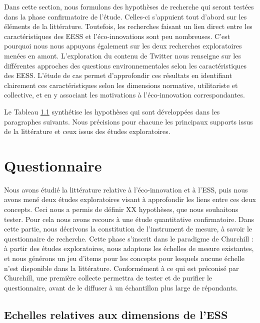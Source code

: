 Dans cette section, nous formulons des hypothèses de recherche qui seront testées dans la phase confirmatoire de l’étude. Celles-ci s’appuient tout d’abord sur les éléments de la littérature. Toutefois, les recherches faisant un lien direct entre les caractéristiques des EESS et l’éco-innovations sont peu nombreuses. C’est pourquoi nous nous appuyons également sur les deux recherches exploratoires menées en amont. L’exploration du contenu de Twitter nous renseigne sur les différentes approches des questions environnementales selon les caractéristiques des EESS. L’étude de cas permet d’approfondir ces résultats en identifiant clairement ces caractéristiques selon les dimensions normative, utilitariste et collective, et en y associant les motivations à l’éco-innovation correspondantes. 

Le Tableau \ref{} synthétise les hypothèses qui sont développées dans les paragraphes suivants. Nous précisions pour chacune les principaux supports issus de la littérature et ceux issus des études exploratoires.


\section{Questionnaire}

Nous avons étudié la littérature relative à l’éco-innovation et à l’ESS, puis nous avons mené deux études exploratoires visant à approfondir les liens entre ces deux concepts. Ceci nous a permis de définir XX hypothèses, que nous souhaitons tester. Pour cela nous avons recours à une étude quantitative confirmatoire. Dans cette partie, nous décrivons la constitution de l’instrument de mesure, à savoir le questionnaire de recherche. Cette phase s’inscrit dans le paradigme de Churchill : à partir des études exploratoires, nous adaptons les échelles de mesure existantes, et nous générons un jeu d’items pour les concepts pour lesquels aucune échelle n’est disponible dans la littérature. Conformément à ce qui est préconisé par Churchill, une première collecte permettra de tester et de purifier le questionnaire, avant de le diffuser à un échantillon plus large de répondants. 

\subsection{Echelles relatives aux dimensions de l’ESS}

